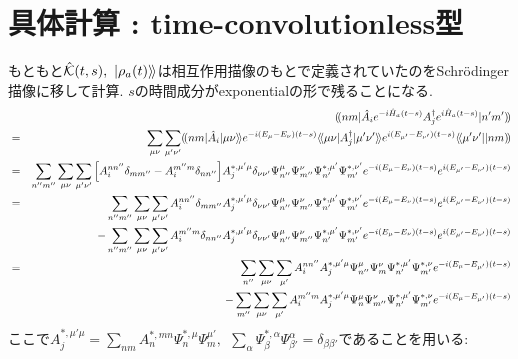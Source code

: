 \documentclass[10.5pt,a4paper]{jreport}
\newcommand{\dket}[1]{| #1 \rangle \! \rangle}
\newcommand{\dbra}[1]{\langle \! \langle #1 |}
\newcommand{\dpbra}[1]{( \! ( #1 |}
\newcommand{\dpket}[1]{| #1 ) \! )}
\newcommand{\calK}{{\cal K}}
\begin{document}
\section{具体計算 : time-convolutionless型}
もともと$\hat{\calK}(t, s),\ \dket{\rho_a(t)}$は相互作用描像のもとで定義されていたのをSchr\"odinger描像に移して計算. $s$の時間成分がexponentialの形で残ることになる.
\begin{eqnarray}
 \nonumber &&\dpbra{nm}\hat{A}_ie^{-i\hat{H}_a(t-s)}A_j^\dagger e^{i\hat{H}_a(t-s)}\dpket{n'm'}\\
  &=& \sum_{\mu\nu}\sum_{\mu'\nu'}\dpbra{nm}\hat{A}_i\dket{\mu\nu}e^{-i(E_\mu - E_\nu)(t-s)}\dbra{\mu\nu}A_j^\dagger \dket{\mu'\nu'}e^{i(E_{\mu'} - E_{\nu'})(t-s)}\dbra{\mu'\nu'}\dpket{nm}\\
  \nonumber &=& \sum_{n''m''}\sum_{\mu\nu}\sum_{\mu'\nu'}\bqty{A_i^{nn''}\delta_{mm''} - A_i^{m''m}\delta_{nn''}}A_j^{*, \mu'\mu}\delta_{\nu\nu'}\Psi_{n''}^{\mu}\Psi_{m''}^{\nu}\Psi_{n'}^{*, \mu'}\Psi_{m'}^{*, \nu'}e^{-i(E_\mu - E_\nu)(t-s)}e^{i(E_{\mu'} - E_{\nu'})(t-s)}\\
  \nonumber &=&\sum_{n''m''}\sum_{\mu\nu}\sum_{\mu'\nu'}A_i^{nn''}\delta_{mm''}A_j^{*, \mu'\mu}\delta_{\nu\nu'}\Psi_{n''}^{\mu}\Psi_{m''}^{\nu}\Psi_{n'}^{*, \mu'}\Psi_{m'}^{*, \nu'}e^{-i(E_\mu - E_\nu)(t-s)}e^{i(E_{\mu'} - E_{\nu'})(t-s)}\\
  &&- \sum_{n''m''}\sum_{\mu\nu}\sum_{\mu'\nu'}A_i^{m''m}\delta_{nn''}A_j^{*, \mu'\mu}\delta_{\nu\nu'}\Psi_{n''}^{\mu}\Psi_{m''}^{\nu}\Psi_{n'}^{*, \mu'}\Psi_{m'}^{*, \nu'}e^{-i(E_\mu - E_\nu)(t-s)}e^{i(E_{\mu'} - E_{\nu'})(t-s)}\\
  \nonumber &=&\sum_{n''}\sum_{\mu\nu}\sum_{\mu'}A_i^{nn''}A_j^{*, \mu'\mu}\Psi_{n''}^{\mu}\Psi_{m}^{\nu}\Psi_{n'}^{*, \mu'}\Psi_{m'}^{*, \nu}e^{-i(E_\mu - E_{\mu'})(t-s)}\\
  &&- \sum_{m''}\sum_{\mu\nu}\sum_{\mu'}A_i^{m''m}A_j^{*, \mu'\mu}\Psi_{n}^{\mu}\Psi_{m''}^{\nu}\Psi_{n'}^{*, \mu'}\Psi_{m'}^{*, \nu}e^{-i(E_\mu - E_{\mu'})(t-s)}\label{mid}
\end{eqnarray}
ここで$A_j^{*,\mu'\mu} = \sum_{nm}A^{*, mn}_n\Psi_n^{*, \mu}\Psi_m^{\mu'},\ \ \sum_\alpha \Psi_\beta^{*, \alpha}\Psi_{\beta'}^\alpha = \delta_{\beta\beta'}$であることを用いる:
\end{document}

